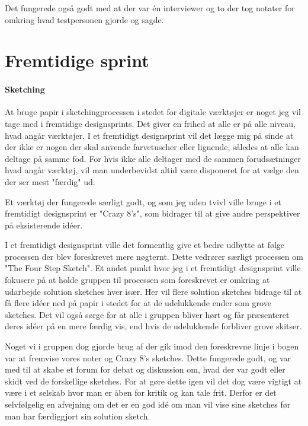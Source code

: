 \documentclass{article}
\begin{document}
Det fungerede også godt med at der var én interviewer og to der tog notater for
omkring hvad testpersonen gjorde og sagde.

\section{Fremtidige sprint}

\paragraph{Sketching} At bruge papir i sketchingprocessen i stedet for digitale
værktøjer er noget jeg vil tage med i fremtidige designsprints. Det giver en
frihed at alle er på alle niveau, hvad angår værktøjer. I et fremtidigt
designsprint vil det lægge mig på sinde at der ikke er nogen der skal anvende
farvetuscher eller lignende, således at alle kan deltage på samme fod. For hvis
ikke alle deltager med de sammen forudsætninger hvad angår værktøj, vil man
underbevidst altid være disponeret for at vælge den der ser mest "færdig" ud.

Et værktøj der fungerede særligt godt, og som jeg uden tvivl ville bruge i et
fremtidigt designsprint er "Crazy 8's", som bidrager til at give andre
perspektiver på eksisterende idéer.

I et fremtidigt designsprint ville det formentlig give et bedre udbytte at følge
processen der blev foreskrevet mere nøgternt. Dette vedrører særligt processen
om "The Four Step Sketch". Et andet punkt hvor jeg i et fremtidigt designsprint
ville fokusere på at holde gruppen til processen som foreskrevet er omkring at
udarbejde solution sketches hver især. Her vil flere solution sketches bidrage
til at få flere idéer ned på papir i stedet for at de udelukkende ender som
grove sketches. Det vil også sørge for at alle i gruppen bliver hørt og får
præsenteret deres idéer på en mere færdig vis, end hvis de udelukkende forbliver
grove skitser.

Noget vi i gruppen dog gjorde brug af der gik imod den foreskrevne linje i bogen
var at fremvise vores noter og Crazy 8's sketches. Dette fungerede godt, og var
med til at skabe et forum for debat og diskussion om, hvad der var godt eller
skidt ved de forskellige sketches.
For at gøre dette igen vil det dog være vigtigt at være i et selskab hvor man
er åben for kritik og kan tale frit. Derfor er det selvfølgelig en afvejning om
det er en god idé om man vil vise sine sketches før man har færdiggjort sin
solution sketch.
\end{document}
